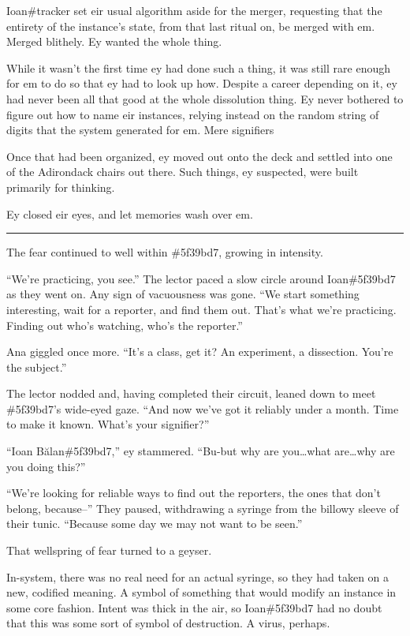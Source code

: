 Ioan\#tracker set eir usual algorithm aside for the merger, requesting that the entirety of the instance's state, from that last ritual on, be merged with em. Merged blithely. Ey wanted the whole thing.

While it wasn't the first time ey had done such a thing, it was still rare enough for em to do so that ey had to look up how. Despite a career depending on it, ey had never been all that good at the whole dissolution thing. Ey never bothered to figure out how to name eir instances, relying instead on the random string of digits that the system generated for em. Mere signifiers

Once that had been organized, ey moved out onto the deck and settled into one of the Adirondack chairs out there. Such things, ey suspected, were built primarily for thinking.

Ey closed eir eyes, and let memories wash over em.

\begin{center}\rule{0.5\linewidth}{0.5pt}\end{center}

The fear continued to well within \#5f39bd7, growing in intensity.

``We're practicing, you see.'' The lector paced a slow circle around Ioan\#5f39bd7 as they went on. Any sign of vacuousness was gone. ``We start something interesting, wait for a reporter, and find them out. That's what we're practicing. Finding out who's watching, who's the reporter.''

Ana giggled once more. ``It's a class, get it? An experiment, a dissection. You're the subject.''

The lector nodded and, having completed their circuit, leaned down to meet \#5f39bd7's wide-eyed gaze. ``And now we've got it reliably under a month. Time to make it known. What's your signifier?''

``Ioan Bălan\#5f39bd7,'' ey stammered. ``Bu-but why are you\ldots{}what are\ldots{}why are you doing this?''

``We're looking for reliable ways to find out the reporters, the ones that don't belong, because--'' They paused, withdrawing a syringe from the billowy sleeve of their tunic. ``Because some day we may not want to be seen.''

That wellspring of fear turned to a geyser.

In-system, there was no real need for an actual syringe, so they had taken on a new, codified meaning. A symbol of something that would modify an instance in some core fashion. Intent was thick in the air, so Ioan\#5f39bd7 had no doubt that this was some sort of symbol of destruction. A virus, perhaps.

